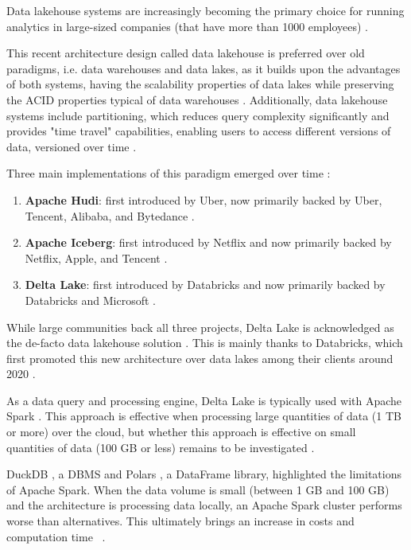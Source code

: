 Data lakehouse systems are increasingly becoming the primary choice for running analytics in large-sized companies (that have more than 1000 employees) \cite{StateDataLakehouse2024}. 

This recent architecture design called data lakehouse \cite{lakehouse2021} is preferred over old paradigms, i.e. data warehouses and data lakes, as it builds upon the advantages of both systems, having the scalability properties of data lakes while preserving the \gls{ACID} properties typical of data warehouses \cite{lakehouse2021}. Additionally, data lakehouse systems include partitioning, which reduces query complexity significantly and provides "time travel" capabilities, enabling users to access different versions of data, versioned over time \cite{crociDataLakehouseHype2022}.

Three main implementations of this paradigm emerged over time \cite{ApacheHudiVs}: 
\begin{enumerate}
    \item \textbf{Apache Hudi}: first introduced by Uber, now primarily backed by Uber, Tencent, Alibaba, and Bytedance \cite{rajaperumalUberEngineeringIncremental2017}.
    \item \textbf{Apache Iceberg}: first introduced by Netflix and now primarily backed by Netflix, Apple, and Tencent \cite{ApacheIcebergApache}.
    \item \textbf{Delta Lake}: first introduced by Databricks and now primarily backed by Databricks and Microsoft \cite{armbrustDeltaLakeHighperformance2020}.
\end{enumerate}

While large communities back all three projects, Delta Lake is acknowledged as the de-facto data lakehouse solution \cite{ApacheHudiVs}. This is mainly thanks to Databricks, which first promoted this new architecture over data lakes among their clients around 2020 \cite{armbrustDeltaLakeHighperformance2020}.

As a data query and processing engine, Delta Lake is typically used with Apache Spark \cite{zahariaApacheSparkUnified2016}. This approach is effective when processing large quantities of data (1 TB or more) over the cloud, but whether this approach is effective on small quantities of data (100 GB or less) remains to be investigated \cite{Khazanchi1801362}.

DuckDB \cite{raasveldtDuckDBEmbeddableAnalytical2019}, a \gls{DBMS} and Polars \cite{vinkWroteOneFastest2021}, a DataFrame library, highlighted the limitations of Apache Spark. When the data volume is small (between 1 GB and 100 GB) and the architecture is processing data locally, an Apache Spark cluster performs worse than alternatives. This ultimately brings an increase in costs and computation time ~\cite{BenchmarkResultsSpark,ebergenUpdatesH2OAi2023}.

